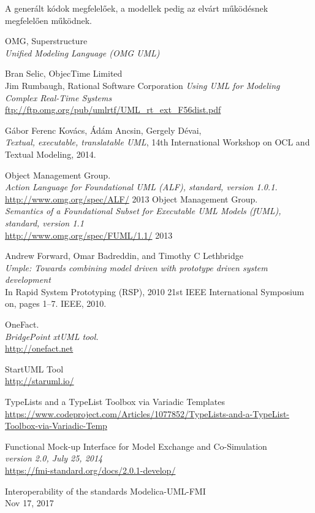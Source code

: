 \documentclass[a4paper,12pt]{report}
\begin{document}
A generált kódok megfelelőek, a modellek pedig az elvárt működésnek megfelelően működnek.

\begin{thebibliography}{4}


	OMG, Superstructure \\
	\emph{Unified Modeling Language (OMG UML)}

	Bran Selic, ObjecTime Limited \\
	Jim Rumbaugh, Rational Software Corporation
	\emph{Using UML for Modeling Complex Real-Time Systems} \\
	\url{ftp://ftp.omg.org/pub/umlrtf/UML_rt_ext_F56dist.pdf}
	

  Gábor Ferenc Kovács, Ádám Ancsin, Gergely Dévai, \\
  \emph{Textual, executable, translatable UML},
  14th International Workshop on OCL and Textual Modeling, 
  2014. 

	Object Management Group. 	\\
	\emph{Action Language for Foundational UML (ALF), standard, version 1.0.1.}\\
	\url{http://www.omg.org/spec/ALF/} 2013
	Object Management Group. \\
	\emph{Semantics of a Foundational Subset for Executable UML Models (fUML), standard, version 1.1} \\
	\url{http://www.omg.org/spec/FUML/1.1/} 2013
	
	Andrew Forward, Omar Badreddin, and Timothy C Lethbridge \\
	\emph{Umple: Towards combining model driven with prototype driven system development} \\
	In Rapid System Prototyping (RSP), 2010 21st IEEE International Symposium on, pages 1–7. IEEE, 2010.

	OneFact. \\	
	\emph{BridgePoint xtUML tool.} \\
	\url{http://onefact.net}
	
	StartUML Tool \\
	\url{http://staruml.io/}
	
	TypeLists and a TypeList Toolbox via Variadic Templates \\
	\url{https://www.codeproject.com/Articles/1077852/TypeLists-and-a-TypeList-Toolbox-via-Variadic-Temp}
	
	Functional Mock-up Interface for Model Exchange and Co-Simulation \\
	\emph{version 2.0, July 25, 2014}  \\
	\url{https://fmi-standard.org/docs/2.0.1-develop/}
	
	Interoperability of the standards Modelica-UML-FMI \\ 
	Nov 17, 2017 \\
	

	
\end{thebibliography}
\end{document}
